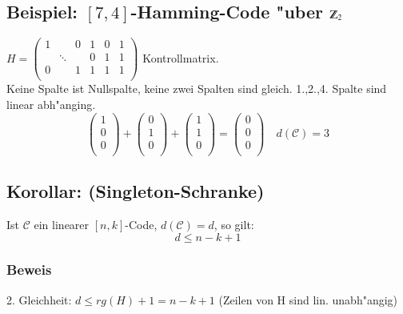 \subsection{Beispiel: $[7,4]$-Hamming-Code "uber $\Z_2$}
$H =
\begin{pmatrix}
1 & & 0 & 1 & 0 & 1\\
   &\ddots &    & 0 & 1 & 1\\
0 & & 1 & 1 & 1 & 1\\
\end{pmatrix}$ Kontrollmatrix.\\
Keine Spalte ist Nullspalte, keine zwei Spalten sind  gleich. 1.,2.,4. Spalte sind linear abh"anging.
\[
	\begin{pmatrix}
	1\\
	0\\
	0\\
	\end{pmatrix} +
	\begin{pmatrix}
	0\\
	1\\
	0\\
	\end{pmatrix} +
	\begin{pmatrix}
	1\\
	1\\
	0\\
	\end{pmatrix} =
	\begin{pmatrix}
	0\\
	0\\
	0\\
	\end{pmatrix} \quad d(\mathcal{C})=3
\]
\subsection{Korollar: (Singleton-Schranke)}
Ist $\mathcal{C}$ ein linearer $[n,k]$-Code, $d(\mathcal{C})=d$, so gilt:
\[
	d \leq n-k + 1
\]
\subsubsection{Beweis}
2. Gleichheit: $d \leq rg(H)+1=n-k+1$ (Zeilen von H sind lin. unabh"angig)
